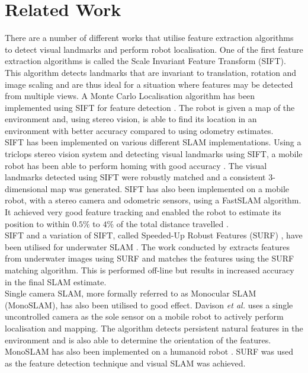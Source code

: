 
\section{Related Work}
\label{sec:relatedWork}
There are a number of different works that utilise feature extraction algorithms to detect visual landmarks and perform robot localisation. One of the first feature extraction algorithms is called the Scale Invariant Feature Transform (SIFT)\citep{Lowe2004}. This algorithm detects landmarks that are invariant to translation, rotation and image scaling and are thus ideal for a situation where features may be detected from multiple views. A Monte Carlo Localisation algorithm has been implemented using SIFT for feature detection \citep{Gil}. The robot is given a map of the environment and, using stereo vision, is able to find its location in an environment with better accuracy compared to using odometry estimates.\\


SIFT has been implemented on various different SLAM implementations. Using a triclops stereo vision system and detecting visual landmarks using SIFT, a mobile robot has been able to perform homing with good accuracy \citep{Se2001, Se2002}. The visual landmarks detected using SIFT were robustly matched and a consistent 3-dimensional map was generated. SIFT has also been implemented on a mobile robot, with a stereo camera and odometric sensors, using a FastSLAM algorithm. It achieved very good feature tracking and enabled the robot to estimate its position to within $0.5\%$ to $4\%$ of the total distance travelled \citep{Barfoot2005}.\\

SIFT and a variation of SIFT, called Speeded-Up Robust Features (SURF) \citep{Bay2008}, have been utilised for underwater SLAM \citep{Aulinas2011, Thomas}. The work conducted by \citet{Aulinas2011} extracts features from underwater images using SURF and matches the features using the SURF matching algorithm. This is performed off-line but results in increased accuracy in the final SLAM estimate.\\

Single camera SLAM, more formally referred to as Monocular SLAM (MonoSLAM), has also been utilised to good effect. Davison \textit{et al.} \citep{Davison2007} uses a single uncontrolled camera as the sole sensor on a mobile robot to actively perform localisation and mapping. The algorithm detects persistent natural features in the environment and is also able to determine the orientation of the features. MonoSLAM has also been implemented on a humanoid robot \citep{Wang2011}. SURF was used as the feature detection technique and visual SLAM was achieved.\\

